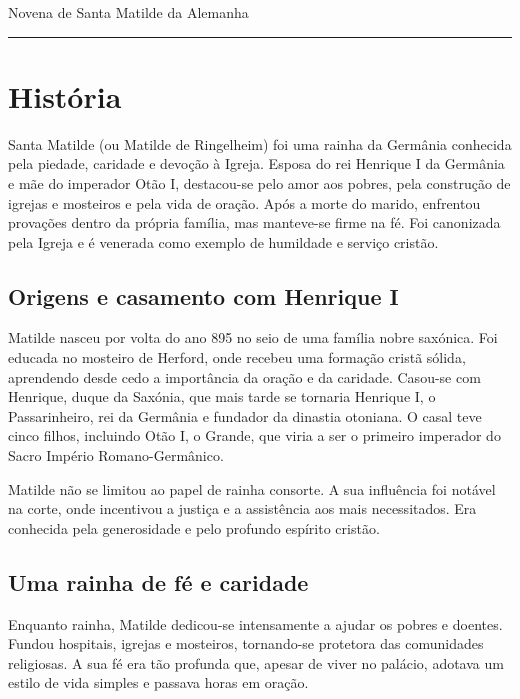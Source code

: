 \documentclass[a4paper,14pt]{extarticle} \usepackage[utf8]{inputenc}
\begin{document}


\begin{center}
  {\huge Novena de Santa Matilde da Alemanha}
\end{center}



\noindent\rule{\textwidth}{0.4pt}

\tableofcontents

\thispagestyle{empty}


\newpage
\section{História}

Santa Matilde (ou Matilde de Ringelheim) foi uma rainha da Germânia conhecida pela piedade, caridade e devoção à Igreja. Esposa do rei Henrique I da Germânia e mãe do imperador Otão I, destacou-se pelo amor aos pobres, pela construção de igrejas e mosteiros e pela vida de oração. Após a morte do marido, enfrentou provações dentro da própria família, mas manteve-se firme na fé. Foi canonizada pela Igreja e é venerada como exemplo de humildade e serviço cristão.

\subsection{Origens e casamento com Henrique I}

Matilde nasceu por volta do ano 895 no seio de uma família nobre saxónica. Foi educada no mosteiro de Herford, onde recebeu uma formação cristã sólida, aprendendo desde cedo a importância da oração e da caridade. Casou-se com Henrique, duque da Saxónia, que mais tarde se tornaria Henrique I, o Passarinheiro, rei da Germânia e fundador da dinastia otoniana. O casal teve cinco filhos, incluindo Otão I, o Grande, que viria a ser o primeiro imperador do Sacro Império Romano-Germânico.

Matilde não se limitou ao papel de rainha consorte. A sua influência foi notável na corte, onde incentivou a justiça e a assistência aos mais necessitados. Era conhecida pela generosidade e pelo profundo espírito cristão.

\subsection{Uma rainha de fé e caridade}

Enquanto rainha, Matilde dedicou-se intensamente a ajudar os pobres e doentes. Fundou hospitais, igrejas e mosteiros, tornando-se protetora das comunidades religiosas. A sua fé era tão profunda que, apesar de viver no palácio, adotava um estilo de vida simples e passava horas em oração.
\end{document}
